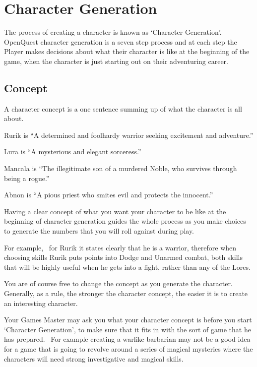 \section{Character Generation}
The process of creating a character is known as `Character Generation'. OpenQuest character generation is a seven step process and at each step the Player makes decisions about what their character is like at the beginning of the game, when the character is just starting out on their adventuring career. 

\subsection{Concept}
A character concept is a one sentence summing up of what the character is all about.

\begin{rpg-examplebox}
\begin{rpg-list}
\item Rurik is ``A determined and foolhardy warrior seeking excitement and adventure.''
\item Lura is ``A mysterious and elegant sorceress.''
\item Mancala is ``The illegitimate son of a murdered Noble, who survives through being a rogue.''
\item Abnon is ``A pious priest who smites evil and protects the innocent.''
\end{rpg-list}
\end{rpg-examplebox}

Having a clear concept of what you want your character to be like at the beginning of character generation guides the whole process as you make choices to generate the numbers that you will roll against during play.

For example,  for Rurik it states clearly that he is a warrior, therefore when choosing skills Rurik puts points into Dodge and Unarmed combat, both skills that will be highly useful when he gets into a fight, rather than any of the Lores.

You are of course free to change the concept as you generate the character. Generally, as a rule, the stronger the character concept, the easier it is to create an interesting character.

Your Games Master may ask you what your character concept is before you start `Character Generation', to make sure that it fits in with the sort of game that he has prepared.  For example creating a warlike barbarian may not be a good idea for a game that is going to revolve around a series of magical mysteries where the characters will need strong investigative and magical skills.

